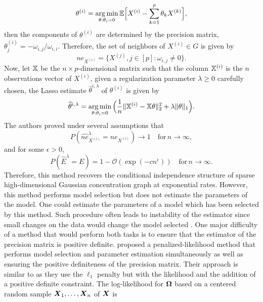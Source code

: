 \begin{equation}
  \theta^{(i)} = \operatorname*{arg\,min}_{\theta:\theta_i=0}{\mathbb E}\Big[ X^{(i)}-\sum_{k=1}^p\theta_k X^{(k)}\Big],
\end{equation}
then the components of $\theta^{(i)}$ are determined by the precision matrix, $\theta^{(i)}_j=-\omega_{i,j}/\omega_{i,i}$. Therefore, the set of neighbors of $X^{(i)}\in G$ is given by
\begin{equation}
  ne_{X^{(i)}}= \{X^{(j)}, j\in[p]: \omega_{i,j} \neq 0 \}.
\end{equation}
Now, let ${\mathbb X}$ be the $n\times p$-dimensional matrix such that the column ${\mathbb X}^{(i)}$ is the $n$ observations vector of $X^{(i)}$, given a regularization parameter $\lambda \geq 0$ carefully chosen, the Lasso estimate $\hat\theta^{i,\lambda}$ of $\theta^{(i)}$ is given by
\begin{equation}
  \widehat\theta^{i,\lambda} = \operatorname*{arg\,min}_{\theta:\theta_i=0}\Big(\frac{1}{n}\|{\mathbb X}^{(i)}-{\mathbb X}\theta \|_2^2 + \lambda\|\theta\|_1 \Big).
\end{equation}
The authors proved under several assumptions that 
\begin{equation}
  P(\hat{ne}_{X^{(i)}}^{\lambda}=ne_{X^{(i)}})\rightarrow 1 \quad \text{for}\, n\rightarrow \infty,
\end{equation}
and for some $\epsilon > 0$,
\begin{equation}
  P(\hat E^{\lambda}=E)=1-\mathcal{O}(\exp(-cn^{\epsilon}))\quad \text{for}\, n\rightarrow \infty.
\end{equation}
Therefore, this method recovers the conditional independence structure of sparse high-dimensional Gaussian concentration graph  at exponential rates. However, this method performs model selection but does not estimate the parameters of the model. One  could estimate the parameters of a model which has been selected by this method. Such procedure often leads to instability of the estimator since small changes on the data would change the model selected \citep{yuanLin_graph, breiman1996}. One major difficulty of a method that would perform both tasks is to ensure that the estimator of the precision matrix is positive definite. \citep{yuanLin_graph} proposed a penalized-likelihood method that performs model selection and parameter estimation simultaneously as well as ensuring the positive definiteness of the precision matrix. Their approach is similar to \citep{meinshausen2006} as they use the $\ell_1$ penalty but with the likelihood and the addition of a positive definite constraint. The log-likelihood for $\boldsymbol\Omega$ based on a  centered random sample $\boldsymbol X_1,\dots,\boldsymbol X_n$ of $\boldsymbol X$ is
